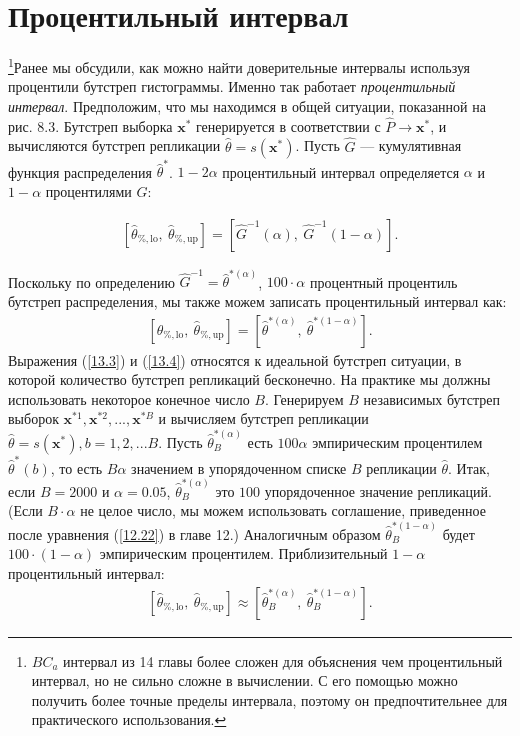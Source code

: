 \section{Процентильный интервал}
\footnote{$BC_{a}$ интервал из 14 главы более сложен для объяснения чем процентильный интервал, но не сильно сложне в вычислении. С его помощью можно получить более точные пределы интервала, поэтому он предпочтительнее для практического использования.}Ранее мы обсудили, как можно найти доверительные интервалы используя процентили бутстреп гистограммы. Именно так работает \textit{процентильный интервал}. Предположим, что мы находимся в общей ситуации, показанной на рис. 8.3. Бутстреп выборка $\textbf{x}^{*}$ генерируется в соответствии с $\widehat{P} \rightarrow \textbf{x}^{*}$, и вычисляются бутстреп репликации $\widehat{\theta} = s(\textbf{x}^{*})$. Пусть $\widehat{G}$ --- кумулятивная функция распределения $\widehat{\theta}^{*}$. $1-2\alpha$ процентильный интервал определяется $\alpha$ и $1 - \alpha$ процентилями  $\widehat{G}$:

\begin{gather}\label{13.3}
[\widehat{\theta}_{\%, \text{lo}},\  \widehat{\theta}_{\%, \text{up}}] = [\widehat{G}^{-1}(\alpha),\ \widehat{G}^{-1}(1 - \alpha)].
\end{gather}

Поскольку по определению $\widehat{G}^{-1} = \widehat{\theta}^{*(\alpha)}$, $100\cdot\alpha$ процентный процентиль бутстреп распределения, мы также можем записать процентильный интервал как:
\begin{gather}\label{13.4}
[\widehat{\theta}_{\%, \text{lo}},\  \widehat{\theta}_{\%, \text{up}}] = [\widehat{\theta}^{*(\alpha)},\ \widehat{\theta}^{*(1 - \alpha)}].
\end{gather}
Выражения (\ref{13.3}) и (\ref{13.4}) относятся к идеальной бутстреп ситуации, в которой количество бутстреп репликаций бесконечно. На практике мы должны использовать некоторое конечное число $B$. Генерируем $B$ независимых бутстреп выборок $\textbf{x}^{*1}, \textbf{x}^{*2},...,\textbf{x}^{*B}$ и вычисляем бутстреп репликации $\widehat{\theta} = s(\textbf{x}^{*}), b = 1, 2, ... B$. Пусть $\widehat{\theta}_{B}^{*(\alpha)}$ есть $100\alpha$ эмпирическим процентилем $\widehat{\theta}^{*}(b)$, то есть $B\alpha$ значением в упорядоченном списке
$B$ репликации $\widehat{\theta}$. Итак, если $B = 2000$ и $\alpha = 0.05$, $\widehat{\theta}_{B}^{*(\alpha)}$ это $100$ упорядоченное значение репликаций. (Если $B\cdot \alpha$ не целое число, мы можем использовать соглашение, приведенное после уравнения (\ref{12.22}) в главе 12.) Аналогичным образом $\widehat{\theta}_{B}^{*(1 - \alpha)}$ будет $100\cdot(1-\alpha)$ эмпирическим процентилем. Приблизительный $1 - \alpha$ процентильный интервал:
\begin{gather}\label{13.5}
[\widehat{\theta}_{\%, \text{lo}}, \ \widehat{\theta}_{\%, \text{up}}] \approx [\widehat{\theta}_{B}^{*(\alpha)}, \ \widehat{\theta}_{B}^{*(1 - \alpha)}].
\end{gather}

